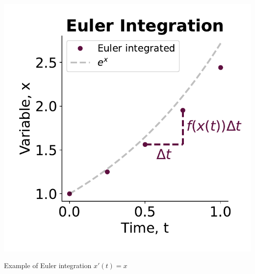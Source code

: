 \begin{marginfigure}
    \centering
    \includegraphics[]{Figs/Theory/euler_integration.pdf}
    \caption{Example of Euler integration $x'(t) = x$}
    \label{fig:Runge-Kutta}
\end{marginfigure}


